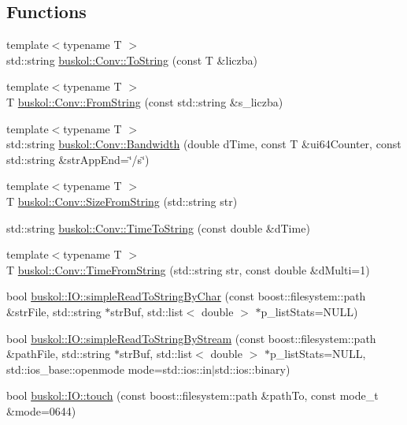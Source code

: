 \subsection*{Functions}
\begin{DoxyCompactItemize}
\item 
{\footnotesize template$<$typename T $>$ }\\std::string \hyperlink{group__libbuskol_ga0b261d6de4c26434d56ba40d00daa68a}{buskol::Conv::ToString} (const T \&liczba)
\item 
{\footnotesize template$<$typename T $>$ }\\T \hyperlink{group__libbuskol_ga6a7a5f3c569284e39dbfea446ffa7037}{buskol::Conv::FromString} (const std::string \&s\_\-liczba)
\item 
{\footnotesize template$<$typename T $>$ }\\std::string \hyperlink{group__libbuskol_gadfc1b8134cb22f8251e3e104a9d82f18}{buskol::Conv::Bandwidth} (double dTime, const T \&ui64Counter, const std::string \&strAppEnd=\char`\"{}/s\char`\"{})
\item 
{\footnotesize template$<$typename T $>$ }\\T \hyperlink{group__libbuskol_gaed62db74cfcb8c4767ed9f8ddd19cbcb}{buskol::Conv::SizeFromString} (std::string str)
\item 
std::string \hyperlink{group__libbuskol_ga6c72f99eb28381403eb06abee5ea7c44}{buskol::Conv::TimeToString} (const double \&dTime)
\item 
{\footnotesize template$<$typename T $>$ }\\T \hyperlink{group__libbuskol_gad76da3426fefe4b30feba7c0e170dccd}{buskol::Conv::TimeFromString} (std::string str, const double \&dMulti=1)
\item 
bool \hyperlink{group__libbuskol_gaa00dee734dcb4383da401abcaa508c70}{buskol::IO::simpleReadToStringByChar} (const boost::filesystem::path \&strFile, std::string $\ast$strBuf, std::list$<$ double $>$ $\ast$p\_\-listStats=NULL)
\item 
bool \hyperlink{group__libbuskol_gac962eb969ccaa2b77a024a28c3c2b702}{buskol::IO::simpleReadToStringByStream} (const boost::filesystem::path \&pathFile, std::string $\ast$strBuf, std::list$<$ double $>$ $\ast$p\_\-listStats=NULL, std::ios\_\-base::openmode mode=std::ios::in$|$std::ios::binary)
\item 
bool \hyperlink{group__libbuskol_ga5fb8ee7fb3a7ecec3502af64538cfc3c}{buskol::IO::touch} (const boost::filesystem::path \&pathTo, const mode\_\-t \&mode=0644)
\item 

\end{DoxyCompactItemize}
